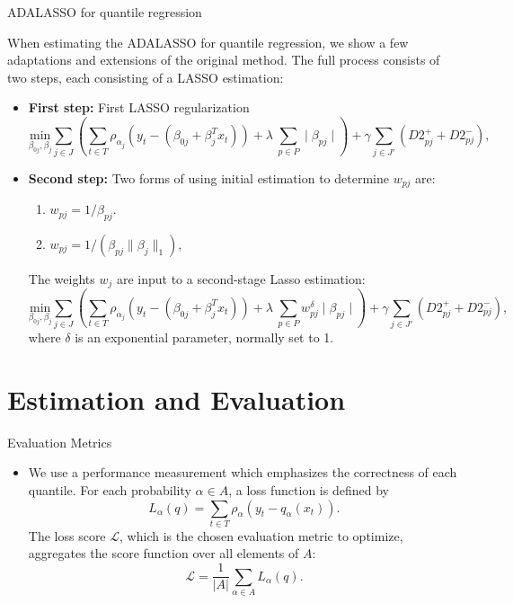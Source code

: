 \documentclass[11pt]{beamer}
\begin{document}
\begin{frame}{ADALASSO for quantile regression}
	

\small
When estimating the ADALASSO for quantile regression, we show a few adaptations and extensions of the original method. The full process consists of two steps, each consisting of a LASSO estimation:
\begin{itemize}
	\item \textbf{First step:} First LASSO regularization
	\[
\underset{\beta_{0j},\beta_j}{\text{min}} \sum_{j \in J} \left( \sum_{t\in T}\rho_{\alpha_j}(y_{t}-(\beta_{0j} + \beta_j^T x_t)) + \lambda\  \sum_{p \in P} \mid  \beta_{pj} \mid \right)  + \gamma \sum_{j \in J'} (D2_{pj}^+ + D2_{pj}^-),
\]
	
	\item \textbf{Second step:} Two forms of using initial estimation to determine $w_{pj}$ are:
	\begin{enumerate}
		\item $w_{pj} = 1/ \beta_{pj}$.
		\item $w_{pj} = 1/ (\beta_{pj} \parallel \beta_j \parallel_1)$,
	\end{enumerate}
	The weights $w_j$ are input to a second-stage Lasso estimation:
		\[
	\underset{\beta_{0j},\beta_j}{\text{min}} \sum_{j \in J} \left( \sum_{t\in T}\rho_{\alpha_j}(y_{t}-(\beta_{0j} + \beta_j^T x_t)) + \lambda\  \sum_{p \in P} w_{pj}^\delta \mid  \beta_{pj} \mid \right) + \gamma \sum_{j \in J'} (D2_{pj}^+ + D2_{pj}^-),
	\]
	where $\delta$ is an exponential parameter, normally set to 1.
	
\end{itemize}



\end{frame}

\section{Estimation and Evaluation}\label{estimation-and-evaluation}

\begin{frame}{Evaluation Metrics}

\begin{itemize}

\item
We use a performance measurement which emphasizes the correctness of
each quantile. For each probability \(\alpha \in A\), a loss function
is defined by
\[L_\alpha(q)= \sum_{t\in T}\rho_{\alpha}(y_{t}-q_{\alpha}(x_t)).\]
The loss score \(\mathcal{L}\), which is the chosen evaluation metric
to optimize, aggregates the score function over all elements of \(A\):
\[\mathcal{L}= \frac{1}{|A|}\sum_{\alpha \in A}L_\alpha(q).\]
\end{itemize}

\end{frame}
\end{document}
